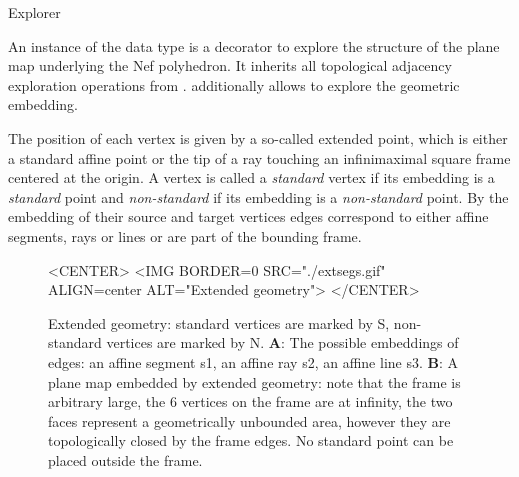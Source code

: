 
\begin{ccRefClass}{Explorer}

\ccDefinition

An instance  of the data type  is a decorator to
explore the structure of the plane map underlying the Nef
polyhedron. It inherits all topological adjacency exploration
operations from . 
additionally allows to explore the geometric embedding.

The position of each vertex is given by a so-called extended point,
which is either a standard affine point or the tip of a ray touching
an infinimaximal square frame centered at the origin. A vertex 
is called a \emph{standard} vertex if its embedding is a
\emph{standard} point and \emph{non-standard} if its embedding is a
\emph{non-standard} point. By the embedding of their source and target
vertices edges correspond to either affine segments, rays or lines or
are part of the bounding frame.

\begin{figure}[htbp]
\begin{ccTexOnly}
\begin{center}
\end{center}
\end{ccTexOnly}
\caption{Extended geometry: standard vertices are marked
by S, non-standard vertices are marked by N. \textbf{A}: The possible
embeddings of edges: an affine segment s1, an affine ray s2, an affine
line s3. \textbf{B}: A plane map embedded by extended geometry: note
that the frame is arbitrary large, the 6 vertices on the frame are at
infinity, the two faces represent a geometrically unbounded area,
however they are topologically closed by the frame edges. No standard
point can be placed outside the frame.}\label{extsegs}
\begin{ccHtmlOnly}
<CENTER>
<IMG BORDER=0 SRC="./extsegs.gif" ALIGN=center
ALT="Extended geometry">
</CENTER>
\end{ccHtmlOnly}
\end{figure}      


\end{ccRefClass}
